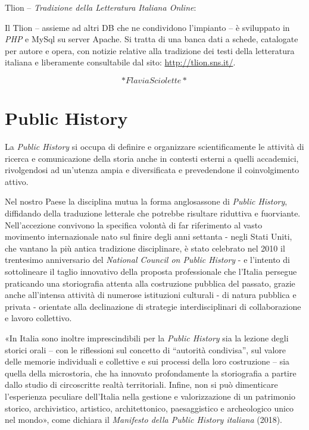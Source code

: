 \documentclass[
  b5paper,
  twoside,
  11pt,
  chapterprefix=false,
  bibliography=totocnumbered,
  parskip=0]{scrbook}
\begin{document}
Tlion -- \emph{Tradizione della Letteratura Italiana Online}:

Il Tlion -- assieme ad altri DB che ne condividono l'impianto -- è
sviluppato in \emph{PHP} e MySql su server Apache. Si tratta di una banca
dati a schede, catalogate per autore e opera, con notizie relative alla
tradizione dei testi della letteratura italiana e liberamente
consultabile dal sito: \url{http://tlion.sns.it/}.

\[*Flavia Sciolette*\]

\hypertarget{public-history}{%
\chapter{Public History}\label{public-history}}

La \emph{Public History} si occupa di definire e organizzare scientificamente
le attività di ricerca e comunicazione della storia anche in contesti
esterni a quelli accademici, rivolgendosi ad un'utenza ampia e
diversificata e prevedendone il coinvolgimento attivo.

Nel nostro Paese la disciplina mutua la forma anglosassone di \emph{Public
History}, diffidando della traduzione letterale che potrebbe risultare
riduttiva e fuorviante. Nell'accezione convivono la specifica volontà di
far riferimento al vasto movimento internazionale nato sul finire degli
anni settanta - negli Stati Uniti, che vantano la più antica tradizione
disciplinare, è stato celebrato nel 2010 il trentesimo anniversario del
\emph{National Council on Public History} - e l'intento di sottolineare il
taglio innovativo della proposta professionale che l'Italia persegue
praticando una storiografia attenta alla costruzione pubblica del
passato, grazie anche all'intensa attività di numerose istituzioni
culturali - di natura pubblica e privata - orientate alla declinazione
di strategie interdisciplinari di collaborazione e lavoro collettivo.

«In Italia sono inoltre imprescindibili per la \emph{Public History} sia la
lezione degli storici orali -- con le riflessioni sul concetto di
\enquote{autorità condivisa}, sul valore delle memorie individuali e collettive
e sui processi della loro costruzione -- sia quella della microstoria,
che ha innovato profondamente la storiografia a partire dallo studio di
circoscritte realtà territoriali. Infine, non si può dimenticare
l'esperienza peculiare dell'Italia nella gestione e valorizzazione di un
patrimonio storico, archivistico, artistico, architettonico,
paesaggistico e archeologico unico nel mondo», come dichiara il
\emph{Manifesto della Public History italiana} (2018).
\end{document}
